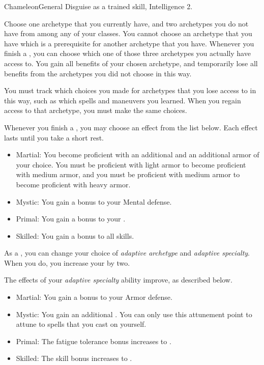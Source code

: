     \begin{feat}{Chameleon}{General}
        \featpre Disguise as a trained skill, Intelligence 2.

         Choose one archetype that you currently have, and two archetypes you do not have from among any of your classes.
        You cannot choose an archetype that you have which is a prerequisite for another archetype that you have.
        Whenever you finish a , you can choose which one of those three archetypes you actually have access to.
        You gain all benefits of your chosen archetype, and temporarily lose all benefits from the archetypes you did not choose in this way.

        You must track which choices you made for archetypes that you lose access to in this way, such as which spells and maneuvers you learned.
        When you regain access to that archetype, you must make the same choices.

         Whenever you finish a , you may choose an effect from the list below.
        Each effect lasts until you take a short rest.
        \begin{itemize}
            \item Martial: You become proficient with an additional  and an additional armor  of your choice.
                You must be proficient with light armor to become proficient with medium armor, and you must be proficient with medium armor to become proficient with heavy armor.
            \item Mystic: You gain a  bonus to your Mental defense.
            \item Primal: You gain a  bonus to your .
            \item Skilled: You gain a  bonus to all skills.
        \end{itemize}

         As a , you can change your choice of \textit{adaptive archetype} and \textit{adaptive specialty}.
        When you do, you increase your  by two.

         The effects of your \textit{adaptive specialty} ability improve, as described below.
        \begin{itemize}
            \item Martial: You gain a  bonus to your Armor defense.
            \item Mystic: You gain an additional .
                You can only use this attunement point to attune to spells that you cast on yourself.
            \item Primal: The fatigue tolerance bonus increases to .
            \item Skilled: The skill bonus increases to .
        \end{itemize}


\end{feat}

